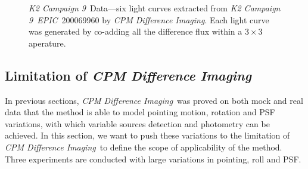 \documentclass[12pt, preprint]{aastex}
\newcommand{\project}[1]{\textsl{#1}}
\newcommand{\cpmdiff}{\project{CPM Difference Imaging}}
\newcommand{\KTCN}{\project{K2 Campaign 9}}
\newcommand{\epic}{\project{EPIC}}
\begin{document}
\begin{figure}[p]
\begin{center}
\end{center}
\caption{
  \label{lightcurve}
  \KTCN\ Data---six light curves extracted from \KTCN\ \epic\ 200069960 by \cpmdiff. 
  Each light curve was generated by co-adding all the difference flux within a $3\times 3$ aperature.
}
\end{figure}


\subsection{Limitation of \cpmdiff}\label{limits}
In previous sections,  \cpmdiff\ was proved on both mock and real data that the method is able to model pointing motion, rotation and PSF variations, with which variable sources detection and photometry can be achieved.
In this section, we want to push these variations to the limitation of \cpmdiff\ to define the scope of applicability of the method. Three experiments are conducted with large variations in pointing, roll and PSF.
\end{document}
